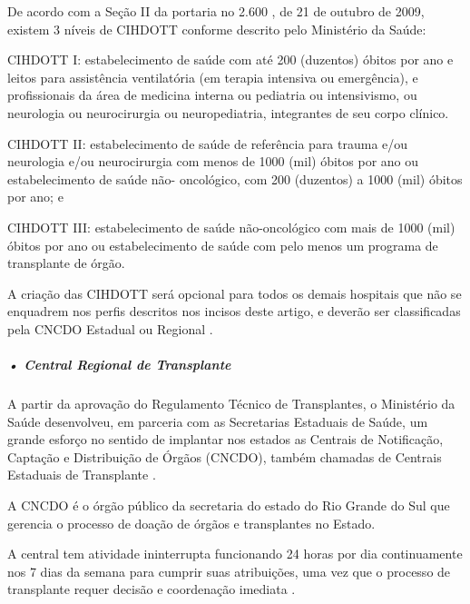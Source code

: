 \documentclass[portuguese,oneside]{tcc}
\begin{document}
De acordo com a Seção II da portaria no 2.600 \cite{PORTARIA}, de 21 de outubro de 2009, existem 3 níveis de CIHDOTT conforme descrito pelo Ministério da Saúde:

CIHDOTT I: estabelecimento de saúde com até 200 (duzentos) óbitos por ano e leitos para assistência ventilatória (em terapia intensiva ou emergência), e profissionais da área de medicina interna ou pediatria ou intensivismo, ou neurologia ou neurocirurgia ou neuropediatria, integrantes de seu corpo clínico.

CIHDOTT II: estabelecimento de saúde de referência para trauma e/ou neurologia e/ou neurocirurgia com menos de 1000 (mil) óbitos por ano ou estabelecimento de saúde não-
oncológico, com 200 (duzentos) a 1000 (mil) óbitos por ano; e

CIHDOTT III: estabelecimento de saúde não-oncológico com mais de 1000 (mil) óbitos por ano ou estabelecimento de saúde com pelo menos um programa de transplante de órgão.

A criação das CIHDOTT será opcional para todos os demais hospitais que não se enquadrem nos perfis descritos nos incisos deste artigo, e deverão ser classificadas pela CNCDO Estadual ou Regional \cite{BVSMS}.



\subparagraph{• Central Regional de Transplante}

A partir da aprovação do Regulamento Técnico de Transplantes, o Ministério da Saúde desenvolveu, em parceria com as Secretarias Estaduais de Saúde, um grande esforço no sentido de implantar nos estados as Centrais de Notificação, Captação e Distribuição de Órgãos (CNCDO), também chamadas de Centrais Estaduais de Transplante \cite{SEST}. 

A CNCDO é o órgão público da secretaria do estado do Rio Grande do Sul que gerencia o processo de doação de órgãos e transplantes no Estado.

A central tem atividade ininterrupta funcionando 24 horas por dia continuamente nos 7 dias da semana para cumprir suas atribuições, uma vez que o processo de transplante requer decisão e coordenação imediata \cite{SCSCT}.
\end{document}
